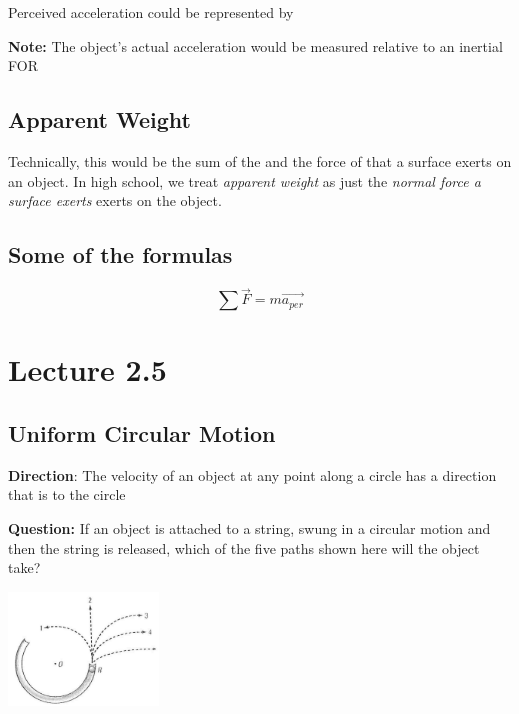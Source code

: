 Perceived acceleration could be represented by 

\begin{redblock}
    \textbf{Note: } The object's actual acceleration would be measured relative to an inertial FOR
\end{redblock}

\subsection{Apparent Weight}
Technically, this would be the sum of the  and the force of  that a surface exerts 
on an object. In high school, we treat \textit{apparent weight} as just the \textit{normal force a surface exerts}
exerts on the object.

\subsection{Some of the formulas}
\[
    \sum \vec{F} = m\vec{a_{per}}
\]

\section{Lecture 2.5}
\subsection{Uniform Circular Motion}
\begin{redblock}
    \textbf{Direction}: The velocity of an object at any point along a circle has a direction that is 
     to the circle
\end{redblock}

\begin{paracol}{2}
    \begin{leftcolumn}
        \textbf{Question:} If an object is attached to a string, swung in a circular motion and then the string is released,
        which of the five paths shown here will the object take?\\
    \end{leftcolumn}

    \begin{rightcolumn}
        \begin{center}
            \includegraphics[width=0.3\textwidth]{graph/circularMotion.png}
        \end{center}
    \end{rightcolumn}
\end{paracol}

